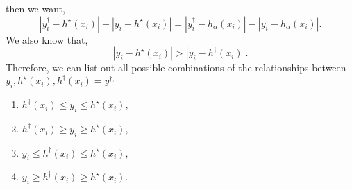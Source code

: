 \documentclass{article}
\begin{document}
then we want,
\begin{equation} 
\left| y^{\dagger}_{i} - h^\star \left(x_{i}\right) \right| - \left| y_{i} - h^\star \left(x_{i}\right) \right| = \left| y^{\dagger}_{i} - h_{\alpha}\left(x_{i}\right) \right| - \left| y_{i} - h_{\alpha}\left(x_{i}\right) \right|.
\end{equation}
We also know that,
\begin{equation} 
\left| y_{i} - h^\star \left(x_{i}\right) \right| > \left| y_{i} - h^{\dagger}\left(x_{i}\right) \right|.
\end{equation}
Therefore, we can list out all possible combinations of the relationships between $y_{i}, h^\star \left(x_{i}\right), h^{\dagger}\left(x_{i}\right) = y^{\dagger,}$
\begin{enumerate}
\item $h^{\dagger}\left(x_{i}\right) \leq  y_{i} \leq  h^\star \left(x_{i}\right),$
\item $h^{\dagger}\left(x_{i}\right) \geq  y_{i} \geq  h^\star \left(x_{i}\right),$
\item $y_{i} \leq  h^{\dagger}\left(x_{i}\right) \leq  h^\star \left(x_{i}\right),$
\item $y_{i} \geq  h^{\dagger}\left(x_{i}\right) \geq  h^\star \left(x_{i}\right).$
\end{enumerate}
\end{document}
